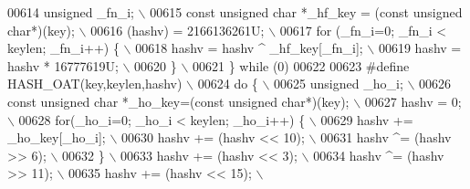 \begin{DoxyCode}
{{{{{{{{00614 \textcolor{preprocessor}{  unsigned \_fn\_i;                                                                \(\backslash\)}
00615 \textcolor{preprocessor}{  const unsigned char *\_hf\_key = (const unsigned char*)(key);                    \(\backslash\)}
00616 \textcolor{preprocessor}{  (hashv) = 2166136261U;                                                         \(\backslash\)}
00617 \textcolor{preprocessor}{  for (\_fn\_i=0; \_fn\_i < keylen; \_fn\_i++) \{                                       \(\backslash\)}
00618 \textcolor{preprocessor}{    hashv = hashv ^ \_hf\_key[\_fn\_i];                                              \(\backslash\)}
00619 \textcolor{preprocessor}{    hashv = hashv * 16777619U;                                                   \(\backslash\)}
00620 \textcolor{preprocessor}{  \}                                                                              \(\backslash\)}
00621 \textcolor{preprocessor}{\} while (0)}
00622 
00623 \textcolor{preprocessor}{#define HASH\_OAT(key,keylen,hashv)                                               \(\backslash\)}
00624 \textcolor{preprocessor}{do \{                                                                             \(\backslash\)}
00625 \textcolor{preprocessor}{  unsigned \_ho\_i;                                                                \(\backslash\)}
00626 \textcolor{preprocessor}{  const unsigned char *\_ho\_key=(const unsigned char*)(key);                      \(\backslash\)}
00627 \textcolor{preprocessor}{  hashv = 0;                                                                     \(\backslash\)}
00628 \textcolor{preprocessor}{  for(\_ho\_i=0; \_ho\_i < keylen; \_ho\_i++) \{                                        \(\backslash\)}
00629 \textcolor{preprocessor}{      hashv += \_ho\_key[\_ho\_i];                                                   \(\backslash\)}
00630 \textcolor{preprocessor}{      hashv += (hashv << 10);                                                    \(\backslash\)}
00631 \textcolor{preprocessor}{      hashv ^= (hashv >> 6);                                                     \(\backslash\)}
00632 \textcolor{preprocessor}{  \}                                                                              \(\backslash\)}
00633 \textcolor{preprocessor}{  hashv += (hashv << 3);                                                         \(\backslash\)}
00634 \textcolor{preprocessor}{  hashv ^= (hashv >> 11);                                                        \(\backslash\)}
00635 \textcolor{preprocessor}{  hashv += (hashv << 15);                                                        \(\backslash\)}
}}}}}}}}
\end{DoxyCode}
